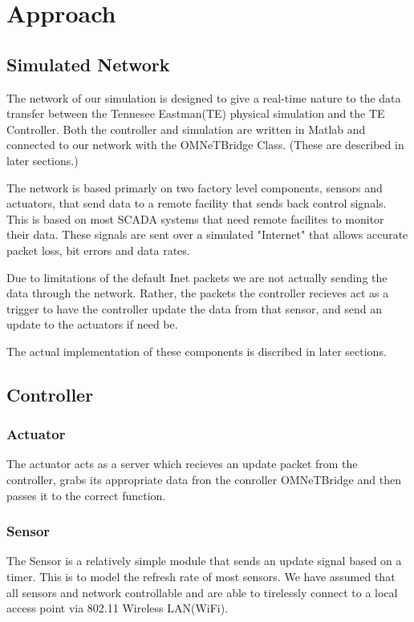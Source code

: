 \section{Approach}
\subsection{Simulated Network}

The network of our simulation is designed to give a real-time nature to the data transfer between the Tennesee Eastman(TE) physical simulation and the TE Controller. Both the controller and simulation are written in Matlab and connected to our network with the OMNeTBridge Class. (These are described in later sections.)

The network is based primarly on two factory level components, sensors and actuators, that send data to a remote facility that sends back control signals. This is based on most SCADA systems that need remote facilites to monitor their data. These signals are sent over a simulated "Internet" that allows accurate packet loss, bit errors and data rates. 

Due to limitations of the default Inet packets we are not actually sending the data through the network. Rather, the packets the controller recieves act as a trigger to have the controller update the data from that sensor, and send an update to the actuators if need be. 

The actual implementation of these components is discribed in later sections. 


\subsection{Controller}


\subsubsection{Actuator}

The actuator acts as a server which recieves an update packet from the controller, grabs its appropriate data fron the conroller OMNeTBridge and then passes it to the correct function.

\subsubsection{Sensor}


The Sensor is a relatively simple module that sends an update signal based on a timer. This is to model the refresh rate of most sensors. We have assumed that all sensors and network controllable and are able to tirelessly connect to a local access point via 802.11 Wireless LAN(WiFi). 

